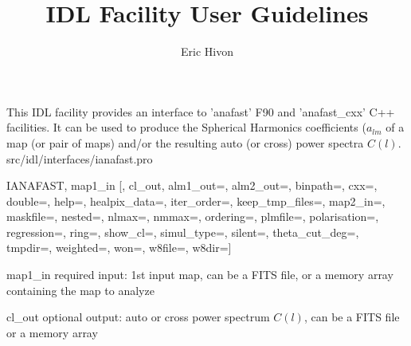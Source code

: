 
\sloppy

\title{\healpix IDL Facility User Guidelines}
 \section[ianafast]{ }
\label{idl:ianafast}
\author{Eric Hivon}

\begin{facility}
{This IDL facility provides an interface to 'anafast' F90 and 'anafast\_cxx' C++
facilities. It can be used to produce the Spherical Harmonics coefficients
($a_{lm}$ of a \healpix map (or pair of maps) and/or the resulting auto (or
cross) power spectra $C(l)$.}
{src/idl/interfaces/ianafast.pro}
\end{facility}

\begin{IDLformat}
{IANAFAST,  map1\_in [, cl\_out,
       alm1\_out=, alm2\_out=, binpath=, cxx=, double=, help=, healpix\_data=, iter\_order=, keep\_tmp\_files=, 
       map2\_in=, maskfile=, nested=, nlmax=, nmmax=, ordering=, plmfile=, polarisation=, 
       regression=, ring=, show\_cl=, simul\_type=, silent=, theta\_cut\_deg=, tmpdir=, 
       weighted=, won=, w8file=, w8dir=]}
\end{IDLformat}

\begin{qualifiers}
  \begin{qulist}{} %
   \item[map1\_in] required input: 1st input map, can be a FITS file, or a memory array containing the
        map to analyze
    \item[cl\_out] optional output: auto or cross power spectrum $C(l)$, can be a FITS
file or a memory array
  \end{qulist}
\end{qualifiers}

